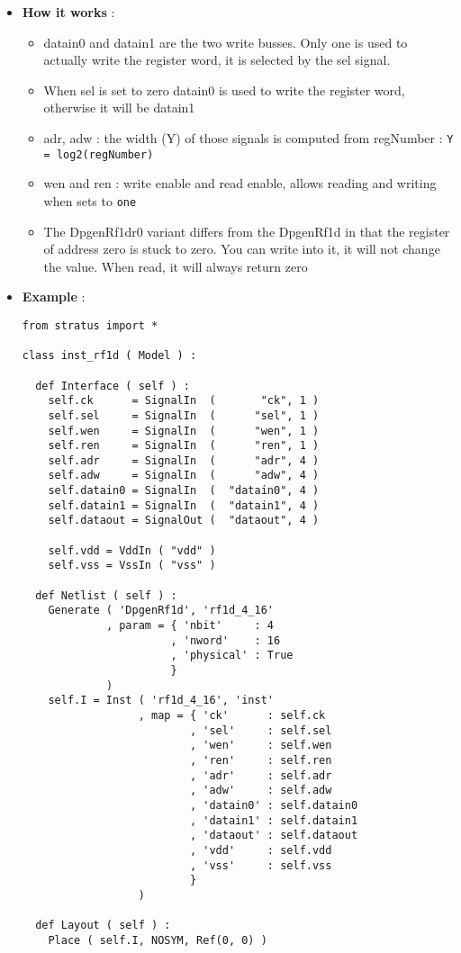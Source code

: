 \begin{itemize}
\begin{itemize}
    \end{itemize}
    \item \textbf{How it works} :
    \begin{itemize}
        \item datain0 and datain1 are the two write busses. Only one is used to actually write the register word, it is selected by the sel signal.
        \item When sel is set to zero datain0 is used to write the register word, otherwise it will be datain1
        \item adr, adw : the width (Y) of those signals is computed from regNumber : \verb-Y = log2(regNumber)-
        \item wen and ren : write enable and read enable, allows reading and writing when sets to \verb-one-
        \item The DpgenRf1dr0 variant differs from the DpgenRf1d in that the register of address zero is stuck to zero. You can write into it, it will not change the value. When read, it will always return zero
    \end{itemize}    
    \item \textbf{Example} :
\begin{verbatim}
from stratus import *

class inst_rf1d ( Model ) :

  def Interface ( self ) :
    self.ck      = SignalIn  (       "ck", 1 )
    self.sel     = SignalIn  (      "sel", 1 )
    self.wen     = SignalIn  (      "wen", 1 )
    self.ren     = SignalIn  (      "ren", 1 )
    self.adr     = SignalIn  (      "adr", 4 )
    self.adw     = SignalIn  (      "adw", 4 )
    self.datain0 = SignalIn  (  "datain0", 4 )
    self.datain1 = SignalIn  (  "datain1", 4 )
    self.dataout = SignalOut (  "dataout", 4 )
      
    self.vdd = VddIn ( "vdd" )
    self.vss = VssIn ( "vss" )
    
  def Netlist ( self ) :
    Generate ( 'DpgenRf1d', 'rf1d_4_16'
             , param = { 'nbit'     : 4
                       , 'nword'    : 16
                       , 'physical' : True
                       }
             )
    self.I = Inst ( 'rf1d_4_16', 'inst'
                  , map = { 'ck'      : self.ck
                          , 'sel'     : self.sel
                          , 'wen'     : self.wen
                          , 'ren'     : self.ren
                          , 'adr'     : self.adr
                          , 'adw'     : self.adw
                          , 'datain0' : self.datain0
                          , 'datain1' : self.datain1
                          , 'dataout' : self.dataout
                          , 'vdd'     : self.vdd
                          , 'vss'     : self.vss
                          }
                  )
    
  def Layout ( self ) :
    Place ( self.I, NOSYM, Ref(0, 0) )
\end{verbatim}
\end{itemize}

